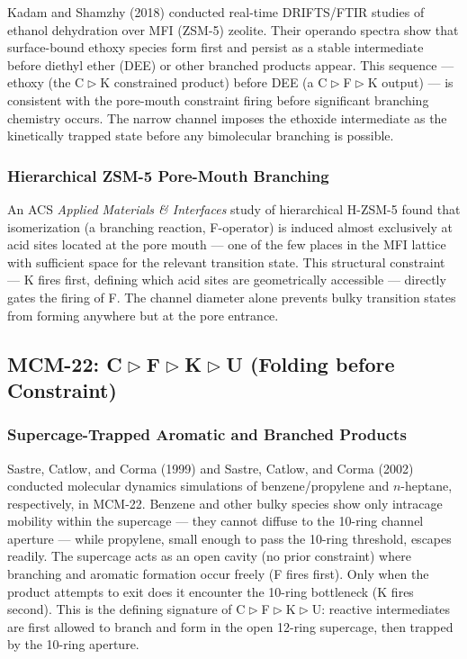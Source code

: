 \documentclass[11pt]{article}
\newcommand{\comp}{\mathrel{\triangleright}} %
\begin{document}
Kadam and Shamzhy (2018) conducted real-time DRIFTS/FTIR studies of ethanol dehydration over MFI (ZSM-5) zeolite. Their operando spectra show that surface-bound ethoxy species form first and persist as a stable intermediate before diethyl ether (DEE) or other branched products appear. This sequence --- ethoxy (the C$\comp$K constrained product) before DEE (a C$\comp$F$\comp$K output) --- is consistent with the pore-mouth constraint firing before significant branching chemistry occurs. The narrow channel imposes the ethoxide intermediate as the kinetically trapped state before any bimolecular branching is possible.

\subsubsection{Hierarchical ZSM-5 Pore-Mouth Branching}

An ACS \emph{Applied Materials \& Interfaces} study of hierarchical H-ZSM-5 found that isomerization (a branching reaction, F-operator) is induced almost exclusively at acid sites located at the pore mouth --- one of the few places in the MFI lattice with sufficient space for the relevant transition state. This structural constraint --- K fires first, defining which acid sites are geometrically accessible --- directly gates the firing of F. The channel diameter alone prevents bulky transition states from forming anywhere but at the pore entrance.

\subsection{MCM-22: C$\comp$F$\comp$K$\comp$U (Folding before Constraint)}

\subsubsection{Supercage-Trapped Aromatic and Branched Products}

Sastre, Catlow, and Corma (1999) and Sastre, Catlow, and Corma (2002) conducted molecular dynamics simulations of benzene/propylene and $n$-heptane, respectively, in MCM-22. Benzene and other bulky species show only intracage mobility within the supercage --- they cannot diffuse to the 10-ring channel aperture --- while propylene, small enough to pass the 10-ring threshold, escapes readily. The supercage acts as an open cavity (no prior constraint) where branching and aromatic formation occur freely (F fires first). Only when the product attempts to exit does it encounter the 10-ring bottleneck (K fires second). This is the defining signature of C$\comp$F$\comp$K$\comp$U: reactive intermediates are first allowed to branch and form in the open 12-ring supercage, then trapped by the 10-ring aperture.
\end{document}
